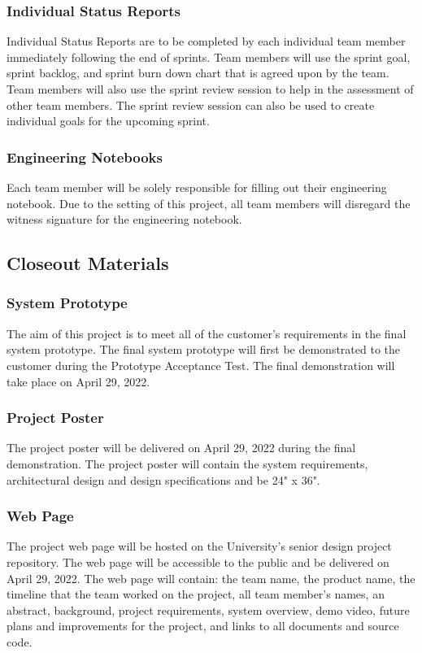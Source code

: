 \subsubsection{Individual Status Reports}
Individual Status Reports are to be completed by each individual team member immediately following the end of sprints. Team members will use the sprint goal, sprint backlog, and sprint burn down chart that is agreed upon by the team. Team members will also use the sprint review session to help in the assessment of other team members. The sprint review session can also be used to create individual goals for the upcoming sprint. 

\subsubsection{Engineering Notebooks}
Each team member will be solely responsible for filling out their engineering notebook. Due to the setting of this project, all team members will disregard the witness signature for the engineering notebook.

\subsection{Closeout Materials}
\subsubsection{System Prototype}
The aim of this project is to meet all of the customer's requirements in the final system prototype. The final system prototype will first be demonstrated to the customer during the Prototype Acceptance Test. The final demonstration will take place on April 29, 2022.

\subsubsection{Project Poster}
The project poster will be delivered on April 29, 2022 during the final demonstration. The project poster will contain the system requirements, architectural design and design specifications and be 24" x 36". 

\subsubsection{Web Page}
The project web page will be hosted on the University's senior design project repository. The web page will be accessible to the public and be delivered on April 29, 2022. The web page will contain: the team name, the product name, the timeline that the team worked on the project, all team member's names, an abstract, background, project requirements, system overview, demo video, future plans and improvements for the project, and links to all documents and source code. 


